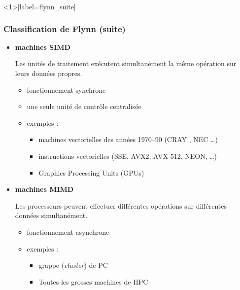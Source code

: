 \documentclass[xcolor={x11names,svgnames}]{beamer}
\begin{document}
\begin{frame}<1>[label=flynn_suite]
\frametitle{Classification de Flynn (suite)}

\begin{itemize}
  
\item {\bf machines SIMD} 

Les unités de traitement %
exécutent simultanément la même opération sur
leurs données propres.
\begin{itemize}
\item fonctionnement synchrone
\item une seule unité de contr\^ole centralisée 
\item exemples :
  \begin{itemize}
  \item machines vectorielles des années 1970--90 (CRAY , NEC \dots)
  \item instructions vectorielles (SSE, AVX2, AVX-512, NEON, \dots)
  \item Graphics Processing Units (GPUs)
  \end{itemize}
\end{itemize}


\item<2-> {\bf machines MIMD} 

Les processeurs peuvent effectuer différentes opérations sur
différentes données simultanément.
\begin{itemize}
\item fonctionnement asynchrone 
\item exemples :
  \begin{itemize}
  \item grappe ({\it cluster}) de PC
  \item Toutes les grosses machines de HPC    
  \end{itemize}
\end{itemize}

\end{itemize}
\end{frame}

\end{document}
